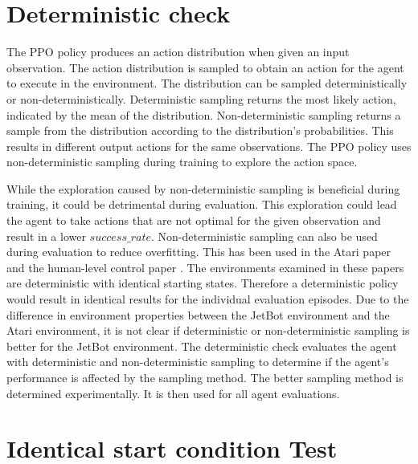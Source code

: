 \section{Deterministic check}

The PPO policy produces an action distribution when given an input observation. The action distribution is sampled to obtain an action for the agent to execute in the environment. The distribution can be sampled deterministically or non-deterministically. Deterministic sampling returns the most likely action, indicated by the mean of the distribution. Non-deterministic sampling returns a sample from the distribution according to the distribution's probabilities. This results in different output actions for the same observations. The PPO policy uses non-deterministic sampling during training to explore the action space. 

While the exploration caused by non-deterministic sampling is beneficial during training, it could be detrimental during evaluation. This exploration could lead the agent to take actions that are not optimal for the given observation and result in a lower $success\_rate$. Non-deterministic sampling can also be used during evaluation to reduce overfitting. This has been used in the Atari paper \autocite{atari} and the human-level control paper \autocite{human_level_control}. The environments examined in these papers are deterministic with identical starting states. Therefore a deterministic policy would result in identical results for the individual evaluation episodes.
Due to the difference in environment properties between the JetBot environment and the Atari environment, it is not clear if deterministic or non-deterministic sampling is better for the JetBot environment. The deterministic check evaluates the agent with deterministic and non-deterministic sampling to determine if the agent's performance is affected by the sampling method. 
The better sampling method is determined experimentally. It is then used for all agent evaluations.






\section{Identical start condition Test}

